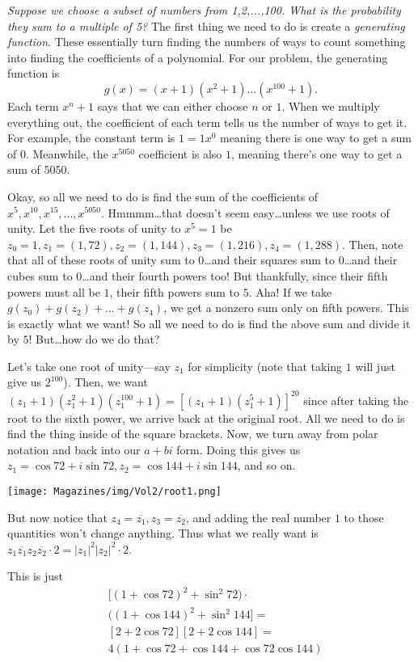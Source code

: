 \documentclass{article}
\begin{document}
\begin{multicols}{3}
\textit{Suppose we choose a subset of numbers from {1,2,...,100}. What is the probability they sum to a multiple of 5?} The first thing we need to do is create a \textit{generating function}. These essentially turn finding the numbers of ways to count something into finding the coefficients of a polynomial. For our problem, the generating function is 
$$g(x)=(x+1)(x^2+1)...(x^{100}+1).$$ 
Each term $x^n+1$ says that we can either choose $n$ or $1$. When we multiply everything out, the coefficient of each term tells us the number of ways to get it. For example, the constant term is $1=1x^0$ meaning there is one way to get a sum of $0$. Meanwhile, the $x^{5050}$ coefficient is also $1$, meaning there’s one way to get a sum of $5050$. 

Okay, so all we need to do is find the sum of the coefficients of $x^5,x^{10},x^{15},...,x^{5050}$. Hmmmm…that doesn’t seem easy…unless we use roots of unity. Let the five roots of unity to $x^5=1$ be $z_0=1, z_1=(1,72), z_2=(1,144), z_3=(1,216), z_4=(1,288)$. Then, note that all of these roots of unity sum to $0$…and their squares sum to $0$…and their cubes sum to $0$…and their fourth powers too! But thankfully, since their fifth powers must all be $1$, their fifth powers sum to $5$. Aha! If we take $g(z_0)+g(z_2)+...+g(z_4)$, we get a nonzero sum only on fifth powers. This is exactly what we want! So all we need to do is find the above sum and divide it by $5$! But…how do we do that? 
	
Let’s take one root of unity—say $z_1$ for simplicity (note that taking $1$ will just give us $2^100$). Then, we want $(z_1+1)(z_1^2+1)(z_1^{100}+1)=[(z_1+1)(z_1^5+1)]^20$ since after taking the root to the sixth power, we arrive back at the original root. All we need to do is find the thing inside of the square brackets. Now, we turn away from polar notation and back into our $a+bi$ form. Doing this gives us $z_1=\cos 72+i\sin 72, z_2=\cos 144+i\sin 144$, and so on. 
\begin{center}
    \texttt{[image: Magazines/img/Vol2/root1.png]}
\end{center}
But now notice that $z_4=\overline{z_1}, z_3=\overline{z_2}$, and adding the real number $1$ to those quantities won't change anything. Thus what we really want is 
$z_1\overline{z_1}z_2\overline{z_2}\cdot 2=|z_1|^2|z_2|^2\cdot 2$. 

This is just 
\begin{align*}
 & [(1+\cos 72)^2+\sin^2 72)  \cdot   \\
 & ((1+\cos 144)^2+\sin^2 144]  = \\
 & [2+2\cos 72][2+2\cos 144]  = \\
 & 4(1+\cos 72+\cos 144+\cos 72 \cos 144)
\end{align*}



\end{multicols}
\end{document}
